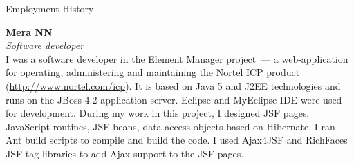 \begin{rubric}{Employment History}
  \parbox{\EmpHistoryBlock}{
  \textbf{Mera NN}\\
  \textit{Software developer}\\
   I was a software developer in the Element Manager project~--- a
   web-application for operating, administering and maintaining the
   Nortel ICP product (\url{http://www.nortel.com/icp}). It is based on
   Java 5 and J2EE technologies and runs on the JBoss 4.2 application
   server. Eclipse and MyEclipse IDE were used for
   development. During my work in this project, I designed JSF pages,
   JavaScript routines, JSF beans, data access objects based on
   Hibernate. I ran Ant build scripts to compile and build the code. I
   used Ajax4JSF and RichFaces JSF tag libraries to add Ajax support
   to the JSF pages.
  }
\end{rubric}
